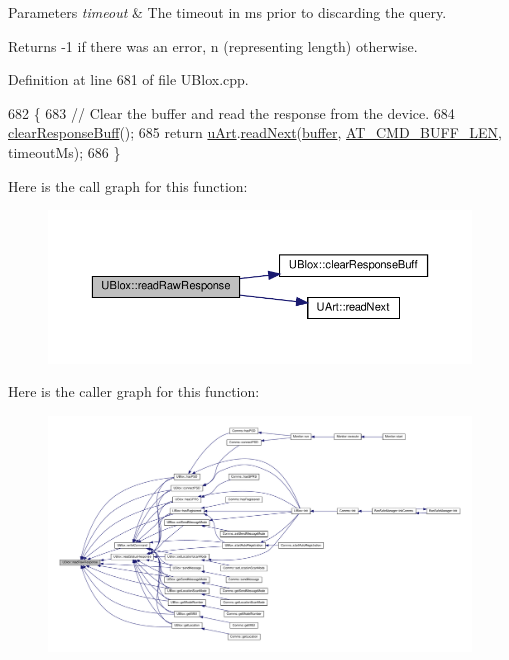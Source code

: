 \begin{DoxyParams}{Parameters}
{\em timeout} & The timeout in ms prior to discarding the query. \\
\hline
\end{DoxyParams}
\begin{DoxyReturn}{Returns}
-\/1 if there was an error, n (representing length) otherwise. 
\end{DoxyReturn}


Definition at line 681 of file U\+Blox.\+cpp.


\begin{DoxyCode}
682 \{
683     \textcolor{comment}{// Clear the buffer and read the response from the device.}
684     \hyperlink{class_u_blox_afc846fbcb1cbd49057b5ce39cd0e0dd6}{clearResponseBuff}();
685     \textcolor{keywordflow}{return} \hyperlink{class_u_blox_a034c0463d1c199d094d657c8ebb151e8}{uArt}.\hyperlink{class_u_art_aa4818ca67447e251680b4b8d28c8bba5}{readNext}(\hyperlink{class_u_blox_a6ca4b90f3dc4e856181dce1ebda6f82c}{buffer}, \hyperlink{_u_blox_8h_aad458adf8f40cbcc1074061f226a112e}{AT\_CMD\_BUFF\_LEN}, timeoutMs);
686 \}
\end{DoxyCode}
Here is the call graph for this function\+:
\nopagebreak
\begin{figure}[H]
\begin{center}
\leavevmode
\includegraphics[width=350pt]{da/df6/class_u_blox_ab4a7ab4b8922d91e23f273ae160c1bed_cgraph}
\end{center}
\end{figure}
Here is the caller graph for this function\+:
\nopagebreak
\begin{figure}[H]
\begin{center}
\leavevmode
\includegraphics[width=350pt]{da/df6/class_u_blox_ab4a7ab4b8922d91e23f273ae160c1bed_icgraph}
\end{center}
\end{figure}
\mbox{\label{class_u_blox_a4eaca5b1b1c4b5b6f6164b220dd43e0b}} 
